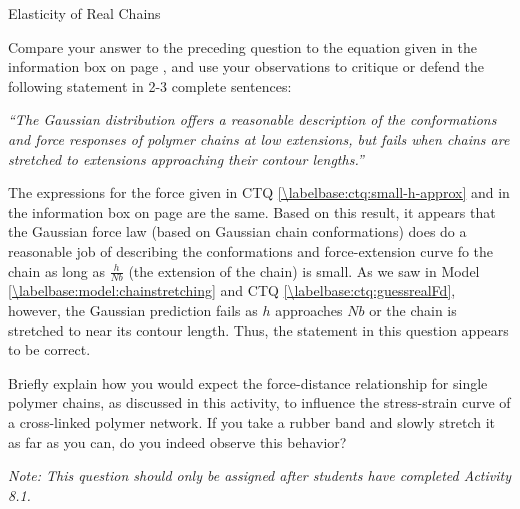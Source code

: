 \begin{activity}[extension]{Elasticity of Real Chains}
\begin{ctqs}
\begin{enumerate}
		\end{enumerate}
		
	\question Compare your answer to the preceding question to the equation given in the information box on page \pageref{\labelbase:info:gaussfd}, and use your observations to critique or defend the following statement in 2-3 complete sentences:
	
		\emph{``The Gaussian distribution offers a reasonable description of the conformations and force responses of polymer chains at low extensions, but fails when chains are stretched to extensions approaching their contour lengths.''}
			
				\begin{solution}[2in]{}
					The expressions for the force given in CTQ \ref{\labelbase:ctq:small-h-approx} and in the information box on page \pageref{\labelbase:info:gaussfd} are the same.  Based on this result, it appears that the Gaussian force law (based on Gaussian chain conformations) does do a reasonable job of describing the conformations and force-extension curve fo the chain as long as $\frac{h}{Nb}$ (the extension of the chain) is small.  As we saw in Model \ref{\labelbase:model:chainstretching} and CTQ \ref{\labelbase:ctq:guessrealFd}, however, the Gaussian prediction fails as $h$ approaches $Nb$ or the chain is stretched to near its contour length.  Thus, the statement in this question appears to be correct.
				\end{solution}
	
\end{ctqs}
	

\begin{exercises}

	
	
	\exercise Briefly explain how you would expect the force-distance relationship for single polymer chains, as discussed in this activity, to influence the stress-strain curve of a cross-linked polymer network.  If you take a rubber band and slowly stretch it as far as you can, do you indeed observe this behavior?
	
		\begin{solution}{}
			\emph{Note: This question should only be assigned \emph{after} students have completed Activity 8.1.}
			

\end{solution}
\end{exercises}
\end{activity}
